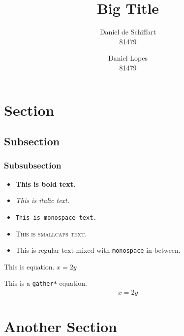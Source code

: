 \documentclass[english,palatino,]{ist-report}
\begin{document}
\title{Big Title}
\author{Daniel de Schiffart \\ 81479 \and Daniel Lopes \\ 81479}
\makecover

\section{Section}

\lipsum[1]

\subsection{Subsection}

\lipsum[1-2]

\subsubsection{Subsubsection}

\begin{itemize}
	\item \textbf{This is bold text.}
	\item \textit{This is italic text.}
	\item \texttt{This is monospace text.}
	\item \textsc{This is smallcaps text.}
	\item This is regular text mixed with \texttt{monospace} in between.
\end{itemize}

This is equation. $x = 2y$

This is a \texttt{gather*} equation.
\begin{gather*}
	x = 2y
\end{gather*}

\section{Another Section}

\lipsum[1-3]
\end{document}
